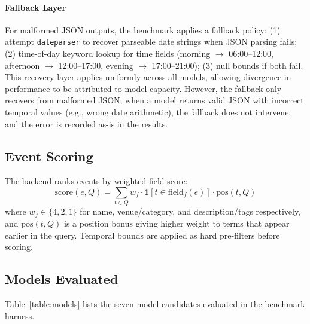 \documentclass[conference]{IEEEtran}
\begin{document}
\paragraph{Fallback Layer}
For malformed JSON outputs, the benchmark applies a fallback policy: (1) attempt \texttt{dateparser} to recover parseable date strings when JSON parsing fails; (2) time-of-day keyword lookup for time fields (morning $\to$ 06:00--12:00, afternoon $\to$ 12:00--17:00, evening $\to$ 17:00--21:00); (3) null bounds if both fail. This recovery layer applies uniformly across all models, allowing divergence in performance to be attributed to model capacity. However, the fallback only recovers from malformed JSON; when a model returns valid JSON with incorrect temporal values (e.g., wrong date arithmetic), the fallback does not intervene, and the error is recorded as-is in the results.


\subsection{Event Scoring}

The backend ranks events by weighted field score:
\[
\text{score}(e, Q) = \sum_{t \in Q} w_f \cdot \mathbf{1}[t \in \text{field}_f(e)] \cdot \text{pos}(t, Q)
\]
where $w_f \in \{4, 2, 1\}$ for name, venue/category, and description/tags respectively, and $\text{pos}(t,Q)$ is a position bonus giving higher weight to terms that appear earlier in the query. Temporal bounds are applied as hard pre-filters before scoring.

\subsection{Models Evaluated}

Table~\ref{table:models} lists the seven model candidates evaluated in the benchmark harness.

\begin{table}[ht]
    \centering
    \caption{Model Candidates}
    \label{table:models}
\end{table}
\end{document}

